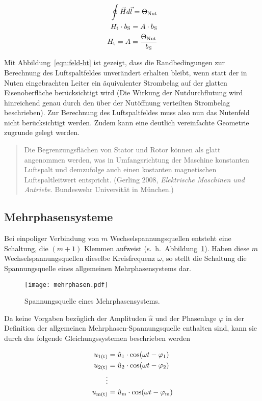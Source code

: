 \begin{align}
\oint \vec{H}d\vec{l} = \Theta_{\mathrm{Nut}} \\
H_{\mathrm{t}}\cdot b_{\mathrm{S}} = A\cdot b_{\mathrm{S}} \\
H_{\mathrm{t}} = A = \frac{\Theta_{\mathrm{Nut}}}{b_{\mathrm{S}}} \label{eqn:feld-ht}
\end{align}

Mit Abbildung~\ref{eqn:feld-ht} ist gezeigt, dass die Randbedingungen zur Berechnung des Luftspaltfeldes unverändert erhalten bleibt, wenn statt der in Nuten eingebrachten Leiter ein äquivalenter Strombelag auf der glatten Eisenoberfläche berücksichtigt wird (Die Wirkung der Nutdurchflutung wird hinreichend genau durch den über der Nutöffnung verteilten Strombelag beschrieben).
Zur Berechnung des Luftspaltfeldes muss also nun das Nutenfeld nicht berücksichtigt werden.
Zudem kann eine deutlich vereinfachte Geometrie zugrunde gelegt werden.

\begin{quote}
Die Begrenzungsflächen von Stator und Rotor können als glatt angenommen werden, was in Umfangsrichtung der Maschine konstanten Luftspalt und demzufolge auch einen kostanten magnetischen Luftspaltleitwert entspricht. (Gerling 2008, \emph{Elektrische Maschinen und Antriebe}. Bundeswehr Universität in München.)
\end{quote}

\subsection{Mehrphasensysteme}
\label{subsec:mehrphasensysteme}

Bei einpoliger Verbindung von $m$ Wechselspannungsquellen entsteht eine Schaltung, die $(m+1)$ Klemmen aufweist (s.~h.~Abbildung~\ref{fig:mehrphasen}).
Haben diese $m$ Wechselspannungsquellen dieselbe Kreisfrequenz $\omega$, so stellt die Schaltung die Spannungsquelle eines allgemeinen Mehrphasensystems dar.

\begin{figure}[!h]
\centering
\texttt{[image: mehrphasen.pdf]}
\label{fig:mehrphasen}
\caption{Spannungsquelle eines Mehrphasensystems.}
\end{figure}

Da keine Vorgaben bezüglich der Amplituden $\hat{u}$ und der Phasenlage $\varphi$ in der Definition der allgemeinen Mehrphasen-Spannungsquelle enthalten sind, kann sie \zB durch das folgende Gleichungssystemen beschrieben werden

\begin{align}
u_{\mathrm{1(t)}} &= \hat{u}_{\mathrm{1}} \cdot \cos(\omega t - \varphi_{\mathrm{1}}) \\
u_{\mathrm{2(t)}} &= \hat{u}_{\mathrm{2}} \cdot \cos(\omega t - \varphi_{\mathrm{2}}) \nonumber  \\
\vdots \nonumber \\
u_{\mathrm{m(t)}} &= \hat{u}_{\mathrm{m}} \cdot \cos(\omega t - \varphi_{\mathrm{m}}) \nonumber
\end{align}

